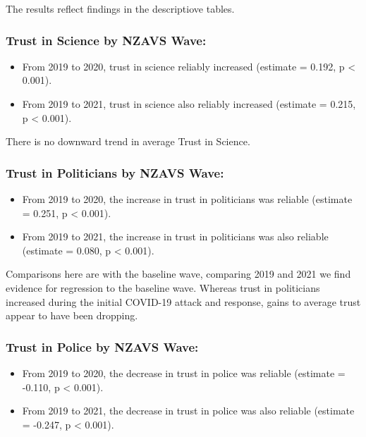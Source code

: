 \documentclass[
  singlecolumn]{report}
\providecommand{\tightlist}{%
  \setlength{\itemsep}{0pt}\setlength{\parskip}{0pt}}\usepackage{longtable,booktabs,array}
\begin{document}
The results reflect findings in the descriptiove tables.

\hypertarget{trust-in-science-by-nzavs-wave}{%
\subsubsection{Trust in Science by NZAVS
Wave:}\label{trust-in-science-by-nzavs-wave}}

\begin{itemize}
\tightlist
\item
  From 2019 to 2020, trust in science reliably increased (estimate =
  0.192, p \textless{} 0.001).
\item
  From 2019 to 2021, trust in science also reliably increased (estimate
  = 0.215, p \textless{} 0.001).
\end{itemize}

There is no downward trend in average Trust in Science.

\hypertarget{trust-in-politicians-by-nzavs-wave}{%
\subsubsection{Trust in Politicians by NZAVS
Wave:}\label{trust-in-politicians-by-nzavs-wave}}

\begin{itemize}
\tightlist
\item
  From 2019 to 2020, the increase in trust in politicians was reliable
  (estimate = 0.251, p \textless{} 0.001).
\item
  From 2019 to 2021, the increase in trust in politicians was also
  reliable (estimate = 0.080, p \textless{} 0.001).
\end{itemize}

Comparisons here are with the baseline wave, comparing 2019 and 2021 we
find evidence for regression to the baseline wave. Whereas trust in
politicians increased during the initial COVID-19 attack and response,
gains to average trust appear to have been dropping.

\hypertarget{trust-in-police-by-nzavs-wave}{%
\subsubsection{Trust in Police by NZAVS
Wave:}\label{trust-in-police-by-nzavs-wave}}

\begin{itemize}
\tightlist
\item
  From 2019 to 2020, the decrease in trust in police was reliable
  (estimate = -0.110, p \textless{} 0.001).
\item
  From 2019 to 2021, the decrease in trust in police was also reliable
  (estimate = -0.247, p \textless{} 0.001).
\end{itemize}
\end{document}
